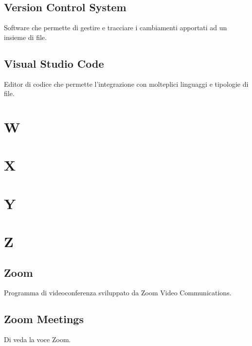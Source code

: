 \subsection{Version Control System}
Software che permette di gestire e tracciare i cambiamenti apportati ad un insieme di file.
\subsection{Visual Studio Code}
Editor di codice che permette l'integrazione con molteplici linguaggi e tipologie di file.
\section{W}
\section{X}
\section{Y}
\section{Z}
\subsection{Zoom}
Programma di videoconferenza sviluppato da Zoom Video Communications.
\subsection{Zoom Meetings}
Di veda la voce Zoom.

